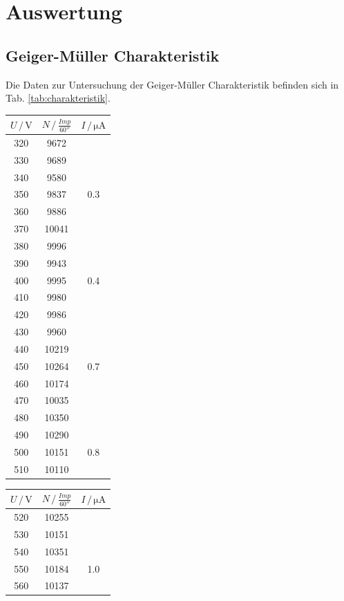 \section{Auswertung}
\label{sec:Auswertung}
\subsection{Geiger-Müller Charakteristik}
Die Daten zur Untersuchung der Geiger-Müller Charakteristik befinden sich in Tab. \ref{tab:charakteristik}.
\begin{table}
    \centering
    \begin{tabular}{ccc}
    \toprule
    $U \,/\, \si{\volt}$ & $N \,/\, \si{\frac{Imp}{60 \second}}$ & $I \,/\, \si{\micro \ampere}$ \\
    \midrule
    320 & 9672 \\
    330 & 9689 \\
    340 & 9580 \\
    350 & 9837 & 0.3 \\
    360 & 9886 \\
    370 & 10041 \\
    380 & 9996 \\
    390 & 9943 \\
    400 & 9995 & 0.4 \\
    410 & 9980 \\
    420 & 9986 \\
    430 & 9960 \\
    440 & 10219 \\
    450 & 10264 & 0.7\\
    460 & 10174 \\
    470 & 10035 \\
    480 & 10350 \\
    490 & 10290 \\
    500 & 10151 & 0.8 \\
    510 & 10110 \\
    \bottomrule
    \end{tabular}
    \begin{tabular}{ccc}
    \toprule
    $U \,/\, \si{\volt}$ & $N \,/\, \si{\frac{Imp}{60 \second}}$ & $I \,/\, \si{\micro \ampere}$ \\
    \midrule
    520 & 10255 \\
    530 & 10151 \\
    540 & 10351 \\
    550 & 10184 & 1.0 \\
    560 & 10137 \\

\end{tabular}
\end{table}
